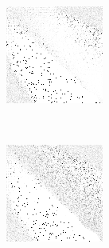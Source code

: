 \begin{figure}
	\begin{subfigure}[t]{0.22\textwidth}
		\includegraphics[width=\textwidth]{images/findings/experiments/randomization/strats/crib_min_avg.png}
		\caption{\cribminavg}
	\end{subfigure}
	~
	\begin{subfigure}[t]{0.22\textwidth}
		\includegraphics[width=\textwidth]{images/findings/experiments/randomization/strats/pegging_max_avg_gained.png}

\end{subfigure}
\end{figure}
